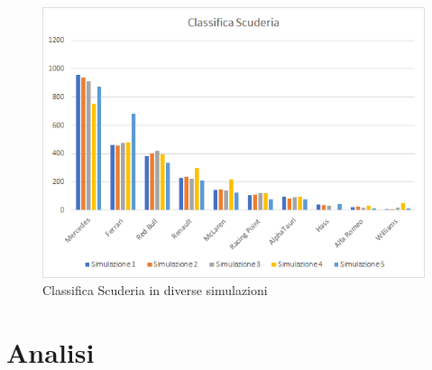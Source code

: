 \begin{figure}[h]
\centering
\includegraphics[width=0.9\linewidth]{images/Classifica Scuderia.png}
\caption{Classifica Scuderia in diverse simulazioni}
\label{fig:Classifica Scuderia in diverse simulazioni}
\end{figure}
\clearpage
\section[Analisi]{Analisi} %

